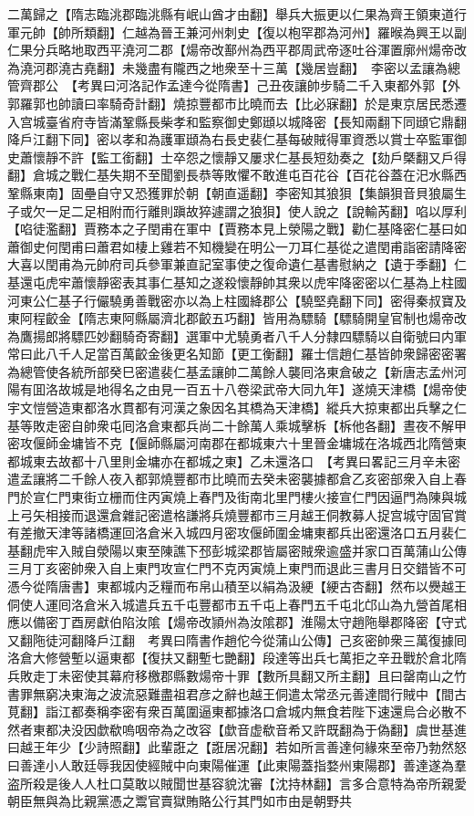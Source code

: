 二萬歸之【隋志臨洮郡臨洮縣有岷山酋才由翻】舉兵大振更以仁果為齊王領東道行軍元帥【帥所類翻】仁越為晉王兼河州刺史【復以枹罕郡為河州】羅㬋為興王以副仁果分兵略地取西平澆河二郡【煬帝改鄯州為西平郡周武帝逐吐谷渾置廓州煬帝改為澆河郡澆古堯翻】未幾盡有隴西之地衆至十三萬【幾居豈翻】　李密以孟讓為總管齊郡公　【考異曰河洛記作孟達今從隋書】己丑夜讓帥步騎二千入東都外郭【外郭羅郭也帥讀曰率騎奇計翻】燒掠豐都市比曉而去【比必寐翻】於是東京居民悉遷入宫城臺省府寺皆滿鞏縣長柴孝和監察御史鄭頲以城降密【長知兩翻下同頲它鼎翻降戶江翻下同】密以孝和為護軍頲為右長史裴仁基每破賊得軍資悉以賞士卒監軍御史蕭懷靜不許【監工銜翻】士卒怨之懷靜又屢求仁基長短劾奏之【劾戶槩翻又戶得翻】倉城之戰仁基失期不至聞劉長恭等敗懼不敢進屯百花谷【百花谷蓋在汜水縣西鞏縣東南】固壘自守又恐獲罪於朝【朝直遥翻】李密知其狼狽【集韻狽音貝狼屬生子或欠一足二足相附而行離則蹎故猝遽謂之狼狽】使人說之【說輸芮翻】啗以厚利【啗徒濫翻】賈務本之子閏甫在軍中【賈務本見上滎陽之戰】勸仁基降密仁基曰如蕭御史何閏甫曰蕭君如棲上雞若不知機變在明公一刀耳仁基從之遣閏甫詣密請降密大喜以閏甫為元帥府司兵參軍兼直記室事使之復命遺仁基書慰納之【遺于季翻】仁基還屯虎牢蕭懷靜密表其事仁基知之遂殺懷靜帥其衆以虎牢降密密以仁基為上柱國河東公仁基子行儼驍勇善戰密亦以為上柱國絳郡公【驍堅堯翻下同】密得秦叔寶及東阿程齩金【隋志東阿縣屬濟北郡齩五巧翻】皆用為驃騎【驃騎開皇官制也煬帝改為鷹揚郎將驃匹妙翻騎奇寄翻】選軍中尤驍勇者八千人分隸四驃騎以自衛號曰内軍常曰此八千人足當百萬齩金後更名知節【更工衡翻】羅士信趙仁基皆帥衆歸密密署為總管使各統所部癸巳密遣裴仁基孟讓帥二萬餘人襲囘洛東倉破之【新唐志孟州河陽有囬洛故城是地得名之由見一百五十八卷梁武帝大同九年】遂燒天津橋【煬帝使宇文愷營造東都洛水貫都有河漢之象因名其橋為天津橋】縱兵大掠東都出兵擊之仁基等敗走密自帥衆屯囘洛倉東都兵尚二十餘萬人乘城擊柝【柝他各翻】晝夜不解甲密攻偃師金墉皆不克【偃師縣屬河南郡在都城東六十里晉金墉城在洛城西北隋營東都城東去故都十八里則金墉亦在都城之東】乙未還洛口　【考異曰畧記三月辛未密遣孟讓將二千餘人夜入都郭燒豐都市比曉而去癸未密襲據都倉乙亥密部衆入自上春門於宣仁門東街立栅而住丙寅燒上春門及街南北里門樓火接宣仁門因逼門為陳與城上弓矢相接而退還倉雜記密遣格謙將兵燒豐都市三月越王侗教募人捉宫城守固官賞有差撤天津等諸橋運回洛倉米入城四月密攻偃師圍金墉東都兵出密還洛口五月裴仁基翻虎牢入賊自滎陽以東至陳譙下邳彭城梁郡皆屬密賊衆逾盛并家口百萬蒲山公傳三月丁亥密帥衆入自上東門攻宣仁門不克丙寅燒上東門而退此三書月日交錯皆不可憑今從隋唐書】東都城内乏糧而布帛山積至以絹為汲綆【綆古杏翻】然布以㸑越王侗使人運囘洛倉米入城遣兵五千屯豐都市五千屯上春門五千屯北邙山為九營首尾相應以備密丁酉房獻伯陷汝隂【煬帝改頴州為汝隂郡】淮陽太守趙陁舉郡降密【守式又翻陁徒河翻降戶江翻　考異曰隋書作趙佗今從蒲山公傳】己亥密帥衆三萬復據囘洛倉大修營塹以逼東都【復扶又翻塹七艷翻】段達等出兵七萬拒之辛丑戰於倉北隋兵敗走丁未密使其幕府移檄郡縣數煬帝十罪【數所具翻又所主翻】且曰罄南山之竹書罪無窮决東海之波流惡難盡祖君彦之辭也越王侗遣太常丞元善達間行賊中【間古莧翻】詣江都奏稱李密有衆百萬圍逼東都據洛口倉城内無食若陛下速還烏合必散不然者東都决没因歔欷嗚咽帝為之改容【歔音虚欷音希又許既翻為于偽翻】虞世基進曰越王年少【少詩照翻】此輩誑之【誑居况翻】若如所言善達何緣來至帝乃勃然怒曰善達小人敢廷辱我因使經賊中向東陽催運【此東陽蓋指婺州東陽郡】善達遂為羣盗所殺是後人人杜口莫敢以賊聞世基容貌沈審【沈持林翻】言多合意特為帝所親愛朝臣無與為比親黨憑之鬻官賣獄賄賂公行其門如市由是朝野共